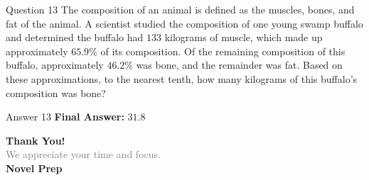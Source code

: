 \documentclass{beamer}
\begin{document}
\begin{frame}{Question 13}
\small
The composition of an animal is defined as the muscles, bones, and fat of the animal. A scientist studied the composition of one young swamp buffalo and determined the buffalo had \(133\) kilograms of muscle, which made up approximately \(65.9\%\) of its composition. Of the remaining composition of this buffalo, approximately \(46.2\%\) was bone, and the remainder was fat. Based on these approximations, to the nearest tenth, how many kilograms of this buffalo's composition was bone?
\end{frame}
\begin{frame}{Answer 13}
\small
\textbf{Final Answer:} $\boxed{31.8}$
\end{frame}

\begin{frame}{}
    \centering
    \vspace{5em}
    {\Huge \textbf{\textcolor{novelPurple}{Thank You!}}} \\[1em]
    {\large \textcolor{gray}{We appreciate your time and focus.}} \\[3em]
    {\LARGE \textbf{\textcolor{novelPurple}{\textsf{Novel Prep}}}}
    \vfill
\end{frame}
\end{document}
